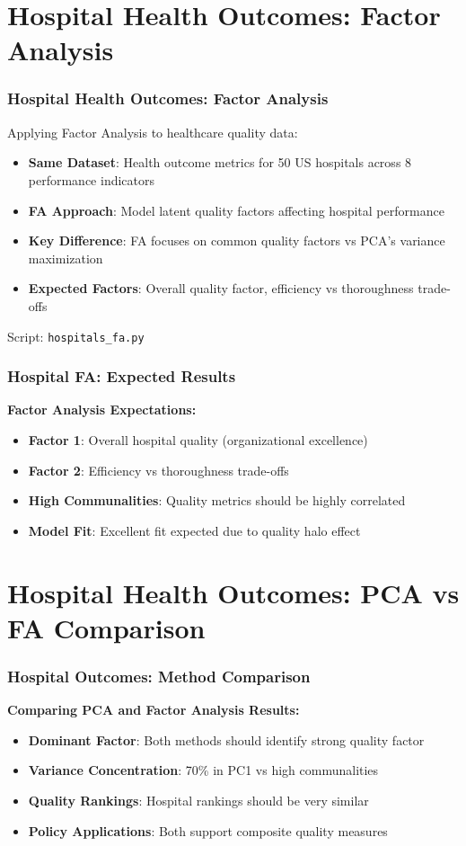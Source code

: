 \documentclass[aspectratio=169]{beamer}
\begin{document}
\section{Hospital Health Outcomes: Factor Analysis}

\begin{frame}
    \frametitle{Hospital Health Outcomes: Factor Analysis}
    Applying Factor Analysis to healthcare quality data:
    \begin{itemize}
        \item \textbf{Same Dataset}: Health outcome metrics for 50 US hospitals across 8 performance indicators \pause
        \item \textbf{FA Approach}: Model latent quality factors affecting hospital performance \pause
        \item \textbf{Key Difference}: FA focuses on common quality factors vs PCA's variance maximization \pause
        \item \textbf{Expected Factors}: Overall quality factor, efficiency vs thoroughness trade-offs \pause
    \end{itemize}
    \vspace{6pt}
    Script: \texttt{hospitals\_fa.py}
\end{frame}

\begin{frame}
    \frametitle{Hospital FA: Expected Results}
    \textbf{Factor Analysis Expectations:}
    \begin{itemize}
        \item \textbf{Factor 1}: Overall hospital quality (organizational excellence) \pause
        \item \textbf{Factor 2}: Efficiency vs thoroughness trade-offs \pause
        \item \textbf{High Communalities}: Quality metrics should be highly correlated \pause
        \item \textbf{Model Fit}: Excellent fit expected due to quality halo effect \pause
    \end{itemize}
\end{frame}

\section{Hospital Health Outcomes: PCA vs FA Comparison}

\begin{frame}
    \frametitle{Hospital Outcomes: Method Comparison}
    \textbf{Comparing PCA and Factor Analysis Results:}
    \begin{itemize}
        \item \textbf{Dominant Factor}: Both methods should identify strong quality factor \pause
        \item \textbf{Variance Concentration}: 70\% in PC1 vs high communalities \pause
        \item \textbf{Quality Rankings}: Hospital rankings should be very similar \pause
        \item \textbf{Policy Applications}: Both support composite quality measures \pause
    \end{itemize}
\end{frame}
\end{document}
